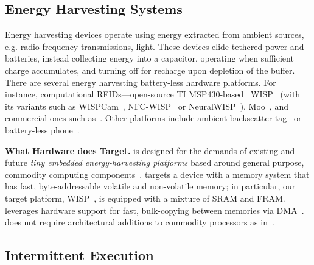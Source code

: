 \subsection{Energy Harvesting Systems}
\label{sec:background_harvesting}

Energy harvesting devices operate using energy extracted from ambient sources, e.g. radio frequency transmissions, light. These devices elide tethered power and batteries, instead collecting energy into a capacitor, operating when sufficient charge accumulates, and turning off for recharge upon depletion of the buffer. There are several energy harvesting battery-less hardware platforms. For instance, computational RFIDs---open-source TI MSP430-based~\cite{wolverine} WISP~\cite{wisp5} (with its variants such as WISPCam~\cite{naderiparizi_rfid_2015}, NFC-WISP~\cite{zhao_rfid_2015} or NeuralWISP~\cite{holleman_biocas_2008}), Moo~\cite{moo}, and commercial ones such as~\cite{medusa_farsens_2017}. Other platforms include ambient backscatter tag~\cite{liu_sigcomm_2013,parks_sigcomm_2014} or battery-less phone~\cite{talla_imwut_2017}. 

\textbf{What Hardware does \sys Target.} \sys is designed for the demands of existing and future \emph{tiny embedded energy-harvesting platforms} based around general purpose, commodity computing components~\cite{wisp,msp430datasheet}. \sys targets a device with a memory system that has fast, byte-addressable volatile and non-volatile memory; in particular, our target platform, WISP~\cite{wisp}, is equipped with a mixture of SRAM and FRAM. \sys leverages hardware support for fast, bulk-copying between memories via DMA~\cite{msp430datasheet}. \sys does not require architectural additions to commodity processors as in~\cite{su_date_2017,hicks_isca_2017,quickrecall,nvp}.

\subsection{Intermittent Execution}
\label{sec:background_consistency}

